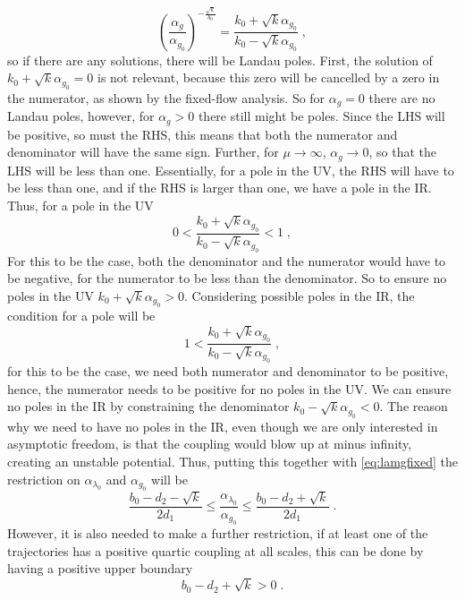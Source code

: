\begin{equation}
    \left(\frac{\alpha_g}{\alpha_{g_0}}\right)^{-\frac{\sqrt{k}}{b_0}}=\frac{k_0+\sqrt{k}\alpha_{g_0}}{k_0-\sqrt{k}\alpha_{g_0}}\;,
\end{equation}
so if there are any solutions, there will be Landau poles. First, the solution of $k_0+\sqrt{k}\alpha_{g_0}=0$ is not relevant, because this zero will be cancelled by a zero in the numerator, as shown by the fixed-flow analysis. So for $\alpha_g=0$ there are no Landau poles, however, for $\alpha_g>0$ there still might be poles. Since the LHS will be positive, so must the RHS, this means that both the numerator and denominator will have the same sign. Further, for $\mu\to \infty$, $\alpha_g\to0$, so that the LHS will be less than one. Essentially, for a pole in the UV, the RHS will have to be less than one, and if the RHS is larger than one, we have a pole in the IR. Thus, for a pole in the UV
\begin{equation}
    0<\frac{k_0+\sqrt{k}\alpha_{g_0}}{k_0-\sqrt{k}\alpha_{g_0}}<1\;,
\end{equation}
For this to be the case, both the denominator and the numerator would have to be negative, for the numerator to be less than the denominator. So to ensure no poles in the UV $k_0+\sqrt{k}\alpha_{g_0}>0$. Considering possible poles in the IR, the condition for a pole will be
\begin{equation}
    1<\frac{k_0+\sqrt{k}\alpha_{g_0}}{k_0-\sqrt{k}\alpha_{g_0}}\;,
\end{equation}
for this to be the case, we need both numerator and denominator to be positive, hence, the numerator needs to be positive for no poles in the UV. We can ensure no poles in the IR by constraining the denominator $k_0-\sqrt{k}\alpha_{g_0}<0$. The reason why we need to have no poles in the IR, even though we are only interested in asymptotic freedom, is that the coupling would blow up at minus infinity, creating an unstable potential. Thus, putting this together with \eqref{eq:lamgfixed} the restriction on $\alpha_{\lambda_0}$ and $\alpha_{g_0}$ will be
\begin{equation}
    \frac{b_0-d_2-\sqrt{k}}{2d_1}\le \frac{\alpha_{\lambda_0}}{\alpha_{g_0}}\le \frac{b_0-d_2+\sqrt{k}}{2d_1}\;.
\end{equation}
However, it is also needed to make a further restriction, if at least one of the trajectories has a positive quartic coupling at all scales, this can be done by having a positive upper boundary
\begin{equation}
    {b_0-d_2+\sqrt{k}}>0\;.
\end{equation}
